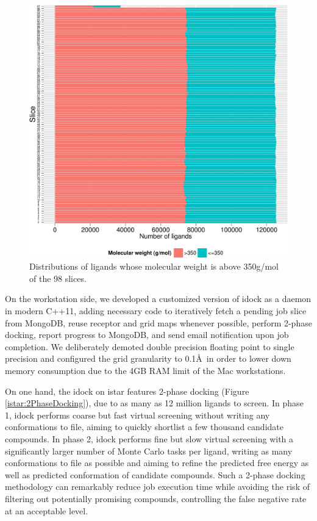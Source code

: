 \begin{figure}
\centering
\includegraphics[width=\linewidth]{istar/gt350.pdf}
\caption{Distributions of ligands whose molecular weight is above 350g/mol of the 98 slices.}
\label{istar:gt350}
\end{figure}

On the workstation side, we developed a customized version of idock as a daemon in modern C++11, adding necessary code to iteratively fetch a pending job slice from MongoDB, reuse receptor and grid maps whenever possible, perform 2-phase docking, report progress to MongoDB, and send email notification upon job completion. We deliberately demoted double precision floating point to single precision and configured the grid granularity to 0.1\AA\ in order to lower down memory consumption due to the 4GB RAM limit of the Mac workstations.

On one hand, the idock on istar features 2-phase docking (Figure \ref{istar:2PhaseDocking}), due to as many as 12 million ligands to screen. In phase 1, idock performs coarse but fast virtual screening without writing any conformations to file, aiming to quickly shortlist a few thousand candidate compounds. In phase 2, idock performs fine but slow virtual screening with a significantly larger number of Monte Carlo tasks per ligand, writing as many conformations to file as possible and aiming to refine the predicted free energy as well as predicted conformation of candidate compounds. Such a 2-phase docking methodology can remarkably reduce job execution time while avoiding the risk of filtering out potentially promising compounds, controlling the false negative rate at an acceptable level.

